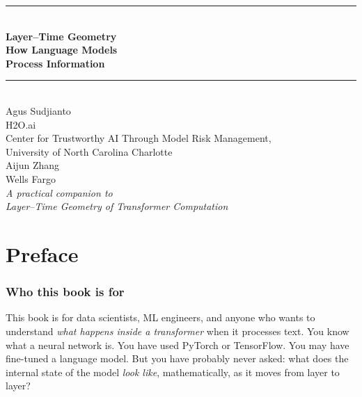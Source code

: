 \documentclass[11pt, twoside, openright]{memoir}
\begin{document}

\frontmatter
\pagestyle{empty}


\begin{titlingpage}
\vspace*{1.5cm}
\begin{center}
  {\color{Navy}\rule{\linewidth}{2pt}}\\[12pt]
  {\Huge\bfseries\sffamily\color{Navy} Layer--Time Geometry}\\[12pt]
  {\LARGE\bfseries\sffamily\color{Navy} How Language Models\\[4pt]
   Process Information}\\[10pt]
  {\color{Navy}\rule{\linewidth}{1.5pt}}\\[20pt]
  {\large\sffamily\color{DGray} Agus Sudjianto}\\[4pt]
  {\normalsize\color{DGray} H2O.ai}\\[2pt]
  {\normalsize\color{DGray} Center for Trustworthy AI Through Model Risk Management,}\\[1pt]
  {\normalsize\color{DGray} University of North Carolina Charlotte}\\[16pt]
  {\large\sffamily\color{DGray} Aijun Zhang}\\[4pt]
  {\normalsize\color{DGray} Wells Fargo}\\[40pt]
  {\normalsize\itshape\color{DGray}
   A practical companion to\\
   \emph{Layer--Time Geometry of Transformer Computation}}
\end{center}
\end{titlingpage}
\clearpage

\chapter*{Preface}

\subsection*{Who this book is for}

This book is for data scientists, ML engineers, and anyone who wants to
understand \emph{what happens inside a transformer} when it processes text.
You know what a neural network is. You have used PyTorch or TensorFlow. You
may have fine-tuned a language model. But you have probably never asked: what
does the internal state of the model \emph{look like}, mathematically, as it
moves from layer to layer?
\end{document}
